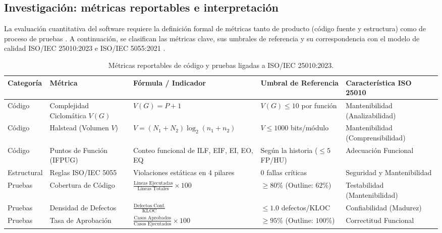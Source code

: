 \documentclass[12pt, letterpaper]{article}
\begin{document}
\subsection{Investigación: métricas reportables e interpretación}

La evaluación cuantitativa del software requiere la definición formal de métricas tanto de producto (código fuente y estructura) como de proceso de pruebas \parencite{iso25010, galin2018}. A continuación, se clasifican las métricas clave, sus umbrales de referencia y su correspondencia con el modelo de calidad ISO/IEC 25010:2023 e ISO/IEC 5055:2021 \parencite{iso25023, iso5055}.

\begin{table}[H]
\centering
\small
\caption{Métricas reportables de código y pruebas ligadas a ISO/IEC 25010:2023.}
\label{tab:metricas_calidad}
\begin{tabular}{|p{2.5cm}|p{3.2cm}|p{3.5cm}|p{2.8cm}|p{3.0cm}|}
\hline
\textbf{Categoría} & \textbf{Métrica} & \textbf{Fórmula / Indicador} & \textbf{Umbral de Referencia} & \textbf{Característica ISO 25010} \\ \hline
Código & Complejidad Ciclomática $V(G)$ & $V(G) = P + 1$ \parencite{mccabe1976} & $V(G) \le 10$ por función & Mantenibilidad (Analizabilidad) \\ \hline
Código & Halstead (Volumen $V$) & $V = (N_1 + N_2) \log_2 (n_1 + n_2)$ & $V \le 1000$ bits/módulo & Mantenibilidad (Comprensibilidad) \\ \hline
Código & Puntos de Función (IFPUG) & Conteo funcional de ILF, EIF, EI, EO, EQ & Según la historia ($\le 5$ FP/HU) & Adecuación Funcional \\ \hline
Estructural & Reglas ISO/IEC 5055 & Violaciones estáticas en 4 pilares & 0 fallas críticas & Seguridad y Mantenibilidad \\ \hline
Pruebas & Cobertura de Código & $\frac{\text{Líneas Ejecutadas}}{\text{Líneas Totales}} \times 100$ & $\ge 80\%$ (Outline: $62\%$) & Testabilidad (Mantenibilidad) \\ \hline
Pruebas & Densidad de Defectos & $\frac{\text{Defectos Conf.}}{\text{KLOC}}$ & $\le 1.0$ defectos/KLOC & Confiabilidad (Madurez) \\ \hline
Pruebas & Tasa de Aprobación & $\frac{\text{Casos Aprobados}}{\text{Casos Ejecutados}} \times 100$ & $\ge 95\%$ (Outline: $100\%$) & Correctitud Funcional \\ \hline
\end{tabular}
\end{table}
\end{document}
